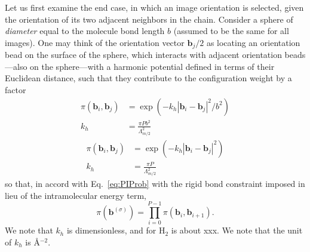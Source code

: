         Let us first examine the end case, in which an image orientation is selected, given the orientation of its two adjacent neighbors in the chain. Consider a sphere of \emph{diameter} equal to the molecule bond length $b$ (assumed to be the same for all images). One may think of the orientation vector ${\mathbf b}_j/2$ as locating an orientation bead on the surface of the sphere, which interacts with adjacent orientation beads---also on the sphere---with a harmonic potential defined in terms of their Euclidean distance, such that they contribute to the configuration weight by a factor
        \ifkhExplicitP
            \begin{equation}
            \label{eq:piRigid}
                \begin{aligned}
                    \pi({\mathbf b}_i,{\mathbf b}_j) &= \exp\left(-k_h |{\mathbf b}_i - {\mathbf b}_j|^2/b^2\right)\\
                    k_h &=\frac{\pi P b^2}{\Lambda^2_{m/2}}\nonumber
                \end{aligned}
            \end{equation}
        \else
            \begin{equation}
            \label{eq:piRigid}
                \begin{aligned}
                    \pi({\mathbf b}_i,{\mathbf b}_j) &= \exp\left(-k_h |{\mathbf b}_i - {\mathbf b}_j|^2\right)\\
                    k_h &=\frac{\pi P}{\Lambda^2_{m/2}}\nonumber
                \end{aligned}
            \end{equation}
        \fi
        so that, in accord with Eq.~\ref{eq:PIProb} with the rigid bond constraint imposed in lieu of the intramolecular energy term,
        \begin{equation}
        \label{eq:piTotal}
            \pi({\mathbf b}^{(\sigma)}) = \prod_{i=0}^{P-1}\pi({\mathbf b}_i,{\mathbf b}_{i+1}).
        \end{equation}
        \ifkhExplicitP
            We note that $k_h$ is dimensionless, and for H$_2$ is about xxx.
        \else
            We note that the unit of $k_h$ is \AA$^{-2}$. 
        \fi

